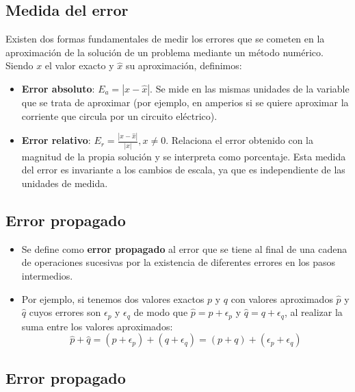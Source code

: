 \documentclass[]{book}
\providecommand{\tightlist}{%
  \setlength{\itemsep}{0pt}\setlength{\parskip}{0pt}}
\begin{document}
\hypertarget{medida-del-error}{%
\subsection{Medida del error}\label{medida-del-error}}

Existen dos formas fundamentales de medir los errores que se cometen en la aproximación de la solución de un problema mediante un método numérico. Siendo \(x\) el valor exacto y \(\hat{x}\) su aproximación, definimos:

\begin{itemize}
\item
  \textbf{Error absoluto}: \(E_a = |x - \hat{x}|\). Se mide en las mismas unidades de la variable que se trata de aproximar (por ejemplo, en amperios si se quiere aproximar la corriente que circula por un circuito eléctrico).
\item
  \textbf{Error relativo}: \(E_r = \frac{|x - \hat{x}|}{|x|}, x\neq 0\). Relaciona el error obtenido con la magnitud de la propia solución y se interpreta como porcentaje. Esta medida del error es invariante a los cambios de escala, ya que es independiente de las unidades de medida.
\end{itemize}

\hypertarget{error-propagado}{%
\subsection{Error propagado}\label{error-propagado}}

\begin{itemize}
\tightlist
\item
  Se define como \textbf{error propagado} al error que se tiene al final de una cadena de operaciones sucesivas por la existencia de diferentes errores en los pasos intermedios.
\item
  Por ejemplo, si tenemos dos valores exactos \(p\) y \(q\) con valores aproximados \(\hat{p}\) y \(\hat{q}\) cuyos errores son \(\epsilon_p\) y \(\epsilon_q\) de modo que \(\hat{p} = p + \epsilon_p\) y \(\hat{q} = q + \epsilon_q\), al realizar la suma entre los valores aproximados:
  \[\hat{p} + \hat{q} = (p + \epsilon_p) + (q + \epsilon_q) = (p + q) + (\epsilon_p + \epsilon_q)\]
\end{itemize}

\hypertarget{error-propagado-1}{%
\subsection{Error propagado}\label{error-propagado-1}}
\end{document}
